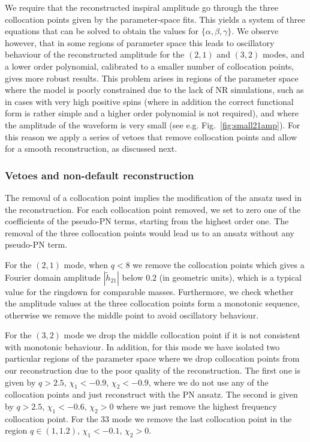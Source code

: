 \documentclass[twocolumn,prd,aps,superscriptaddress,preprintnumbers,tightenlines,showpacs,nofootinbib,eqsecnum,amsfonts,amsmath]{revtex4}
\begin{document}
We require that the reconstructed inspiral amplitude
 go through the three collocation points given by the parameter-space fits. This yields a system of three equations that can be solved to obtain the values for $\{\alpha, \beta, \gamma\}$.
We observe however, that in some regions of
parameter space this leads to oscillatory behaviour of the reconstructed amplitude for the $(2,1)$ and $(3,2)$ modes, and a lower order polynomial, calibrated to a smaller number of collocation points, gives more robust results. 
%
This problem arises in regions of the parameter space where the model is poorly constrained due to the lack of NR simulations, such as in cases with very high positive spins (where in addition the correct functional form is rather simple and a higher order polynomial is not required), and where the amplitude of the waveform is very small (see e.g. Fig.~\ref{fig:small21amp}). For this reason we apply a series of vetoes that remove collocation points and allow for a smooth reconstruction, as discussed next.

\subsubsection{Vetoes and non-default reconstruction}\label{subsubsec:insp_vetoes}
The removal of a collocation point implies the modification of the ansatz used in the reconstruction. For each collocation point removed, we set to zero one of the coefficients of the pseudo-PN terms, starting from the highest order one. The removal of the three collocation points would lead us to an ansatz without any pseudo-PN term.

For the $(2,1)$ mode, when $q<8$ we remove the collocation points which gives a Fourier domain amplitude $|\tilde{h}_{21}|$ below $0.2$ (in geometric units), which is a typical value for the ringdown for comparable masses. Furthermore, we check whether the amplitude values at the three collocation points form a monotonic sequence, otherwise we remove the middle point to avoid oscillatory behaviour. 

For the $(3,2)$ mode we drop the middle collocation point if it is not consistent with monotonic behaviour. In addition, for this mode we have isolated two particular regions of the parameter space where 
we drop collocation points from our reconstruction due to the poor quality of the reconstruction. The first one is given by $q>2.5$, $\chi_1<-0.9$, $\chi_2<-0.9$, where we do not use any of the collocation points and just reconstruct with the PN ansatz. The second is given by $q>2.5$, $\chi_1<-0.6$, $\chi_2>0$ where we just remove the highest frequency collocation point.
For the 33 mode we remove the last collocation point in the region $q \in (1,1.2)$, $\chi_1<-0.1$, $\chi_2>0$.
\end{document}
